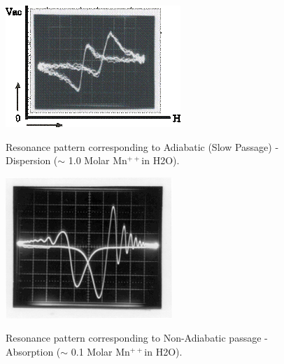 \documentclass{../lab}
\begin{document}
\begin{figure}[h]
\begin{minipage}[t]{0.31\textwidth}
    \href{http://experimentationlab.berkeley.edu/sites/default/files/images/250px-NMR18.gif}{\includegraphics[width=\linewidth]{images/250px-NMR18.png}}
    \caption{Resonance pattern corresponding to Adiabatic (Slow Passage) - Dispersion ($\sim$ 1.0 Molar Mn$^{++}$in H2O).}
    \label{fig:AdiabaticDispersion}
\end{minipage}\hfill
\begin{minipage}[t]{0.31\textwidth}
    \href{http://experimentationlab.berkeley.edu/sites/default/files/images/NMR19.gif}{\includegraphics[width=\linewidth]{images/NMR19.png}}
    \caption{Resonance pattern corresponding to Non-Adiabatic passage - Absorption ($\sim$ 0.1 Molar Mn$^{++}$in H2O).}
    \label{fig:NonAdiabaticAbsorption}
\end{minipage}
\end{figure}
\end{document}
